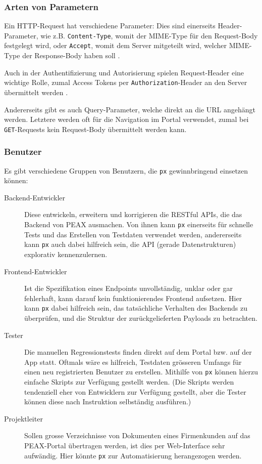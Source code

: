 \subsubsection{Arten von Parametern}

Ein HTTP-Request hat verschiedene Parameter: Dies sind einerseits Header-Parameter, wie z.B. \texttt{Content-Type}, womit der MIME-Type für den Request-Body festgelegt wird, oder \texttt{Accept}, womit dem Server mitgeteilt wird, welcher MIME-Type der Response-Body haben soll \cite{RFC2616}.

Auch in der Authentifizierung und Autorisierung spielen Request-Header eine wichtige Rolle, zumal Access Tokens per \texttt{Authorization}-Header an den Server übermittelt werden \cite[Kapitel 7.1]{RFC6794}.

Andererseits gibt es auch Query-Parameter, welche direkt an die URL angehängt werden. Letztere werden oft für die Navigation im Portal verwendet, zumal bei \texttt{GET}-Requests kein Request-Body übermittelt werden kann.

\subsubsection{Benutzer}
\label{sec:Benutzer}

Es gibt verschiedene Gruppen von Benutzern, die \texttt{px} gewinnbringend einsetzen können:

\begin{description}
    \item[Backend-Entwickler] Diese entwickeln, erweitern und korrigieren die RESTful APIs, die das Backend von PEAX ausmachen. Von ihnen kann \texttt{px} einerseits für schnelle Tests und das Erstellen von Testdaten verwendet werden, andererseits kann \texttt{px} auch dabei hilfreich sein, die API (gerade Datenstrukturen) explorativ kennenzulernen.
    \item[Frontend-Entwickler] Ist die Spezifikation eines Endpoints unvollständig, unklar oder gar fehlerhaft, kann darauf kein funktionierendes Frontend aufsetzen. Hier kann \texttt{px} dabei hilfreich sein, das tatsächliche Verhalten des Backends zu überprüfen, und die Struktur der zurückgelieferten Payloads zu betrachten.
    \item[Tester] Die manuellen Regressionstests finden direkt auf dem Portal bzw. auf der App statt. Oftmals wäre es hilfreich, Testdaten grösseren Umfangs für einen neu registrierten Benutzer zu erstellen. Mithilfe von \texttt{px} können hierzu einfache Skripts zur Verfügung gestellt werden. (Die Skripts werden tendenziell eher von Entwicklern zur Verfügung gestellt, aber die Tester können diese nach Instruktion selbständig ausführen.)
    \item[Projektleiter] Sollen grosse Verzeichnisse von Dokumenten eines Firmenkunden auf das PEAX-Portal übertragen werden, ist dies per Web-Interface sehr aufwändig. Hier könnte \texttt{px} zur Automatisierung herangezogen werden.
\end{description}

